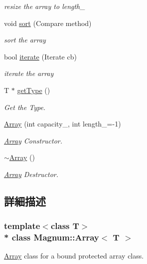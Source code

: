 \begin{DoxyCompactItemize}
\begin{DoxyCompactList}\small\item\em resize the array to length\+\_\+ \end{DoxyCompactList}\item 
void \hyperlink{class_magnum_1_1_array_a4a15db86ad451329b74fa2a69dd8b516}{sort} (Compare method)
\begin{DoxyCompactList}\small\item\em sort the array \end{DoxyCompactList}\item 
bool \hyperlink{class_magnum_1_1_array_adca79cbde0c3525849e540eb5e5f4638}{iterate} (Iterate cb)
\begin{DoxyCompactList}\small\item\em iterate the array \end{DoxyCompactList}\item 
T $\ast$ \hyperlink{class_magnum_1_1_array_a22b27a4f591381a49b297735cfca4476}{get\+Type} ()
\begin{DoxyCompactList}\small\item\em Get the Type. \end{DoxyCompactList}\item 
\hyperlink{class_magnum_1_1_array_a05badbd2016cf939f27f736573b763cf}{Array} (int capacity\+\_\+, int length\+\_\+=-\/1)
\begin{DoxyCompactList}\small\item\em \hyperlink{class_magnum_1_1_array}{Array} Constructor. \end{DoxyCompactList}\item 
\hyperlink{class_magnum_1_1_array_a8ccfb9840110ad703ae7c9afab99a553}{$\sim$\+Array} ()
\begin{DoxyCompactList}\small\item\em \hyperlink{class_magnum_1_1_array}{Array} Destructor. \end{DoxyCompactList}\end{DoxyCompactItemize}


\subsection{詳細描述}
\subsubsection*{template$<$class T$>$\\*
class Magnum\+::\+Array$<$ T $>$}

\hyperlink{class_magnum_1_1_array}{Array} class for a bound protected array class. 

